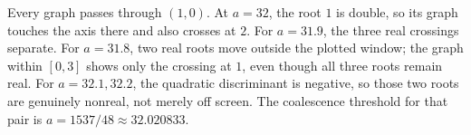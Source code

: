 Every graph passes through $(1,0)$. At $a=32$, the root $1$ is
double, so its graph touches the axis there and also crosses at $2$.
For $a=31.9$, the three real crossings separate. For $a=31.8$,
two real roots move outside the plotted window; the graph within
$[0,3]$ shows only the crossing at $1$, even though all three roots
remain real. For $a=32.1,32.2$, the quadratic discriminant is negative,
so those two roots are genuinely nonreal, not merely off screen.
The coalescence threshold for that pair is $a=1537/48\approx32.020833$.
